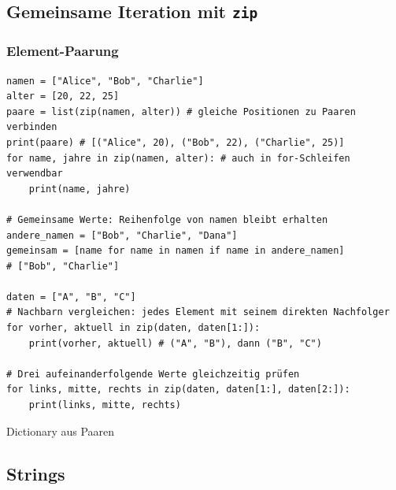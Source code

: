\subsection{Gemeinsame Iteration mit \texttt{zip}}\label{sec:01-zip}
\subsubsection{Element-Paarung}\label{sec:01-zip-pairs}
\begin{codebox}
\begin{lstlisting}[style=CodeExpert]
namen = ["Alice", "Bob", "Charlie"]
alter = [20, 22, 25]
paare = list(zip(namen, alter)) # gleiche Positionen zu Paaren verbinden
print(paare) # [("Alice", 20), ("Bob", 22), ("Charlie", 25)]
for name, jahre in zip(namen, alter): # auch in for-Schleifen verwendbar
    print(name, jahre)

# Gemeinsame Werte: Reihenfolge von namen bleibt erhalten
andere_namen = ["Bob", "Charlie", "Dana"]
gemeinsam = [name for name in namen if name in andere_namen]
# ["Bob", "Charlie"]

daten = ["A", "B", "C"]
# Nachbarn vergleichen: jedes Element mit seinem direkten Nachfolger
for vorher, aktuell in zip(daten, daten[1:]):
    print(vorher, aktuell) # ("A", "B"), dann ("B", "C")

# Drei aufeinanderfolgende Werte gleichzeitig prüfen
for links, mitte, rechts in zip(daten, daten[1:], daten[2:]):
    print(links, mitte, rechts)
\end{lstlisting}
Dictionary aus Paaren 
\end{codebox}

\ZSFmanualColumnBreak
\subsection{Strings}\label{sec:01-strings}

